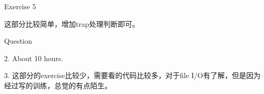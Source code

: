 \documentclass[GBK,winfonts,a4paper,10pt]{ctexart}
\begin{document}
\begin{section}{ Exercise 5 }
\par
这部分比较简单，增加trap处理判断即可。
\end{section}

\begin{section}{ Question }
\par
2. About 10 hours.
\par
3. 这部分的exercise比较少，需要看的代码比较多，对于file I/O有了解，但是因为经过写的训练，总觉的有点陌生。
\end{section}
\end{document}
